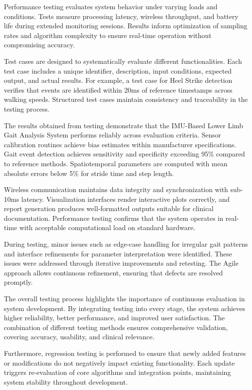 \documentclass[12pt,a4paper]{report}
\begin{document}
Performance testing evaluates system behavior under varying loads and conditions. Tests measure processing latency, wireless throughput, and battery life during extended monitoring sessions. Results inform optimization of sampling rates and algorithm complexity to ensure real-time operation without compromising accuracy.

Test cases are designed to systematically evaluate different functionalities. Each test case includes a unique identifier, description, input conditions, expected output, and actual results. For example, a test case for Heel Strike detection verifies that events are identified within 20ms of reference timestamps across walking speeds. Structured test cases maintain consistency and traceability in the testing process.

The results obtained from testing demonstrate that the IMU-Based Lower Limb Gait Analysis System performs reliably across evaluation criteria. Sensor calibration routines achieve bias estimates within manufacturer specifications. Gait event detection achieves sensitivity and specificity exceeding 95\% compared to reference methods. Spatiotemporal parameters are computed with mean absolute errors below 5\% for stride time and step length.

Wireless communication maintains data integrity and synchronization with sub-10ms latency. Visualization interfaces render interactive plots correctly, and report generation produces well-formatted outputs suitable for clinical documentation. Performance testing confirms that the system operates in real-time with acceptable computational load on standard hardware.

During testing, minor issues such as edge-case handling for irregular gait patterns and interface refinements for parameter interpretation were identified. These issues were addressed through iterative improvements and retesting. The Agile approach allows continuous refinement, ensuring that defects are resolved promptly.

The overall testing process highlights the importance of continuous evaluation in system development. By integrating testing into every stage, the system achieves higher reliability, better performance, and improved user satisfaction. The combination of different testing methods ensures comprehensive validation, covering accuracy, usability, and clinical relevance.

Furthermore, regression testing is performed to ensure that newly added features or modifications do not negatively impact existing functionality. Each update triggers re-evaluation of core algorithms and integration points, maintaining system stability throughout development.
\end{document}
